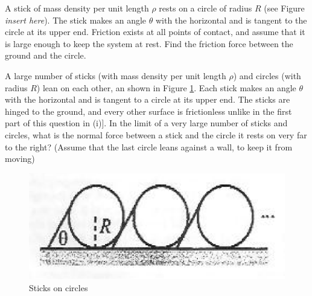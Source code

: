 \begin{problem}
    \begin{subproblem}
        A stick of mass density per unit length $\rho$ rests on a circle of radius $R$ (see Figure \textit{insert here}). The stick makes an angle $\theta$ with the horizontal and is tangent to the circle at its upper end. Friction exists at all points of contact, and assume that it is large enough to keep the system at rest. Find the friction force between the ground and the circle.
    \end{subproblem}

    \begin{subproblem}
        A large number of sticks (with mass density per unit length $\rho$) and circles (with radius $R$) lean on each other, an shown in Figure \ref{2011q5}. Each stick makes an angle $\theta$ with the horizontal and is tangent to a circle at its upper end. The sticks are hinged to the ground, and every other surface is frictionless unlike in the first part of this question in (i)]. In the limit of a very large number of sticks and circles, what is the normal force between a stick and the circle it rests on very far to the right? (Assume that the last circle leans against a wall, to keep it from moving)
        \begin{figure}[h]
	        \centering
	        \includegraphics[width=0.7\linewidth]{spho_book_TYS_images/2011q5.png}
	        \caption{Sticks on circles}\label{2011q5}
        \end{figure}
    \end{subproblem}
\end{problem}



